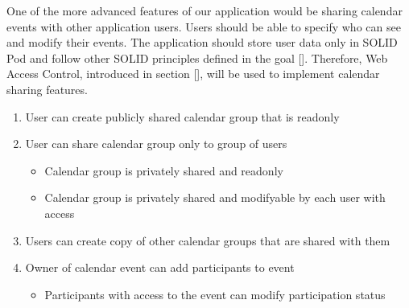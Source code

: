 One of the more advanced features of our application would be sharing calendar events with other application users. Users should be able to specify who can see and modify their events. The application should store user data only in SOLID Pod and follow other SOLID principles defined in the goal []. Therefore, Web Access Control, introduced in section [], will be used to implement calendar sharing features.

\begin{enumerate}[label=\color{reqcolor}\textbf{R{\arabic*}}, resume]
    \item \label{app:req:sharing1} User can create publicly shared calendar group that is readonly
    \item \label{app:req:sharing2} User can share calendar group only to group of users    
        \begin{itemize}
            \item Calendar group is privately shared and readonly
            \item Calendar group is privately shared and modifyable by each user with access
        \end{itemize}
    \item \label{app:req:sharing3} Users can create copy of other calendar groups that are shared with them
    \item \label{app:req:sharing4} Owner of calendar event can add participants to event
        \begin{itemize}
            \item Participants with access to the event can modify participation status
        \end{itemize}
\end{enumerate}


